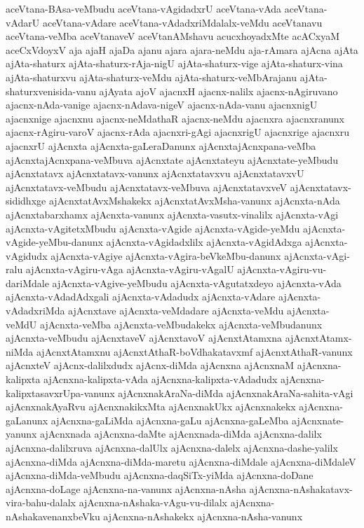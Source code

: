 {aceVtana-BAsa-veMbudu
aceVtana-vAgidadxrU
aceVtana-vAda
aceVtana-vAdarU
aceVtana-vAdare
aceVtana-vAdadxriMdalalx-veMdu
aceVtanavu
aceVtana-veMba
aceVtanaveV
aceVtanAMshavu
acucxhoyadxMte
acACxyaM
aceCxVdoyxV
aja
ajaH
ajaDa
ajanu
ajara
ajara-neMdu
aja-rAmara
ajAcna
ajAta
ajAta-shaturx
ajAta-shaturx-rAja-nigU
ajAta-shaturx-vige
ajAta-shaturx-vina
ajAta-shaturxvu
ajAta-shaturx-veMdu
ajAta-shaturx-veMbArajanu
ajAta-shaturxvenisida-vanu
ajAyata
ajoV
ajacnxH
ajacnx-nalilx
ajacnx-nAgiruvano
ajacnx-nAda-vanige
ajacnx-nAdava-nigeV
ajacnx-nAda-vanu
ajacnxnigU
ajacnxnige
ajacnxnu
ajacnx-neMdathaR
ajacnx-neMdu
ajacnxra
ajacnxranunx
ajacnx-rAgiru-varoV
ajacnx-rAda
ajacnxri-gAgi
ajacnxrigU
ajacnxrige
ajacnxru
ajacnxrU
ajAcnxta
ajAcnxta-gaLeraDanunx
ajAcnxtajAcnxpana-veMba
ajAcnxtajAcnxpana-veMbuva
ajAcnxtate
ajAcnxtateyu
ajAcnxtate-yeMbudu
ajAcnxtatavx
ajAcnxtatavx-vanunx
ajAcnxtatavxvu
ajAcnxtatavxvU
ajAcnxtatavx-veMbudu
ajAcnxtatavx-veMbuva
ajAcnxtatavxveV
ajAcnxtatavx-sididhxge
ajAcnxtatAvxMshakekx
ajAcnxtatAvxMsha-vanunx
ajAcnxta-nAda
ajAcnxtabarxhamx
ajAcnxta-vanunx
ajAcnxta-vasutx-vinalilx
ajAcnxta-vAgi
ajAcnxta-vAgitetxMbudu
ajAcnxta-vAgide
ajAcnxta-vAgide-yeMdu
ajAcnxta-vAgide-yeMbu-danunx
ajAcnxta-vAgidadxlilx
ajAcnxta-vAgidAdxga
ajAcnxta-vAgidudx
ajAcnxta-vAgiye
ajAcnxta-vAgira-beVkeMbu-danunx
ajAcnxta-vAgi-ralu
ajAcnxta-vAgiru-vAga
ajAcnxta-vAgiru-vAgalU
ajAcnxta-vAgiru-vu-dariMdale
ajAcnxta-vAgive-yeMbudu
ajAcnxta-vAgutatxdeyo
ajAcnxta-vAda
ajAcnxta-vAdadAdxgali
ajAcnxta-vAdadudx
ajAcnxta-vAdare
ajAcnxta-vAdadxriMda
ajAcnxtave
ajAcnxta-veMdadare
ajAcnxta-veMdu
ajAcnxta-veMdU
ajAcnxta-veMba
ajAcnxta-veMbudakekx
ajAcnxta-veMbudanunx
ajAcnxta-veMbudu
ajAcnxtaveV
ajAcnxtavoV
ajAcnxtAtamxna
ajAcnxtAtamx-niMda
ajAcnxtAtamxnu
ajAcnxtAthaR-boVdhakatavxmf
ajAcnxtAthaR-vanunx
ajAcnxteV
ajAcnx-dalilxdudx
ajAcnx-diMda
ajAcnxna
ajAcnxnaM
ajAcnxna-kalipxta
ajAcnxna-kalipxta-vAda
ajAcnxna-kalipxta-vAdadudx
ajAcnxna-kalipxtasavxrUpa-vanunx
ajAcnxnakAraNa-diMda
ajAcnxnakAraNa-sahita-vAgi
ajAcnxnakAyaRvu
ajAcnxnakikxMta
ajAcnxnakUkx
ajAcnxnakekx
ajAcnxna-gaLanunx
ajAcnxna-gaLiMda
ajAcnxna-gaLu
ajAcnxna-gaLeMba
ajAcnxnate-yanunx
ajAcnxnada
ajAcnxna-daMte
ajAcnxnada-diMda
ajAcnxna-dalilx
ajAcnxna-dalilxruva
ajAcnxna-dalUlx
ajAcnxna-dalelx
ajAcnxna-dashe-yalilx
ajAcnxna-diMda
ajAcnxna-diMda-maretu
ajAcnxna-diMdale
ajAcnxna-diMdaleV
ajAcnxna-diMda-veMbudu
ajAcnxna-daqSiTx-yiMda
ajAcnxna-doDane
ajAcnxna-doLage
ajAcnxna-na-vanunx
ajAcnxna-nAsha
ajAcnxna-nAshakatavx-vira-bahu-dalalx
ajAcnxna-nAshaka-vAgu-vu-dilalx
ajAcnxna-nAshakavenanxbeVku
ajAcnxna-nAshakekx
ajAcnxna-nAsha-vanunx
}
